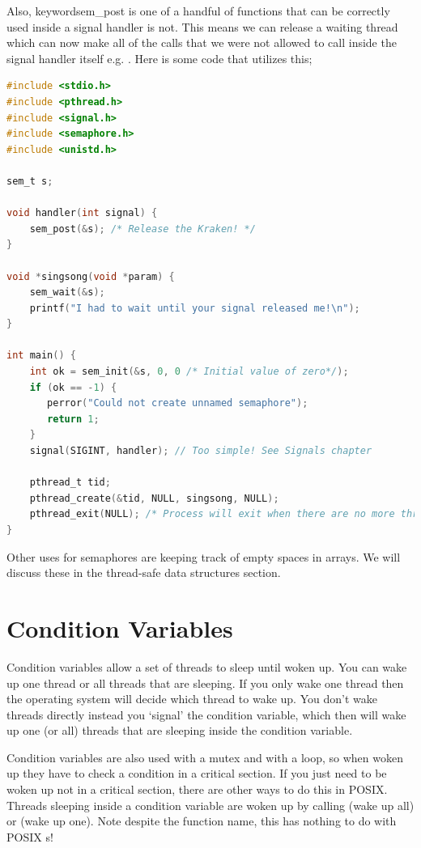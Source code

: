 Also, keyword{sem\_post} is one of a handful of functions that can be correctly used inside a signal handler  is not.
This means we can release a waiting thread which can now make all of the calls that we were not allowed to call inside the signal handler itself e.g. .
Here is some code that utilizes this;

\begin{lstlisting}[language=C]
#include <stdio.h>
#include <pthread.h>
#include <signal.h>
#include <semaphore.h>
#include <unistd.h>

sem_t s;

void handler(int signal) {
    sem_post(&s); /* Release the Kraken! */
}

void *singsong(void *param) {
    sem_wait(&s);
    printf("I had to wait until your signal released me!\n");
}

int main() {
    int ok = sem_init(&s, 0, 0 /* Initial value of zero*/);
    if (ok == -1) {
       perror("Could not create unnamed semaphore");
       return 1;
    }
    signal(SIGINT, handler); // Too simple! See Signals chapter

    pthread_t tid;
    pthread_create(&tid, NULL, singsong, NULL);
    pthread_exit(NULL); /* Process will exit when there are no more threads */
}
\end{lstlisting}

Other uses for semaphores are keeping track of empty spaces in arrays. We will discuss these in the thread-safe data structures section.

\section{Condition Variables}

Condition variables allow a set of threads to sleep until woken up.
You can wake up one thread or all threads that are sleeping.
If you only wake one thread then the operating system will decide which thread to wake up.
You don't wake threads directly instead you `signal' the condition variable, which then will wake up one (or all) threads that are sleeping inside the condition variable.

Condition variables are also used with a mutex and with a loop, so when woken up they have to check a condition in a critical section.
If you just need to be woken up not in a critical section, there are other ways to do this in POSIX.
Threads sleeping inside a condition variable are woken up by calling  (wake up all) or  (wake up one).
Note despite the function name, this has nothing to do with POSIX s!


